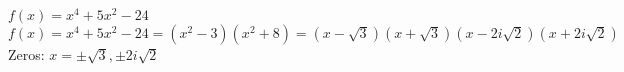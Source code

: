 {$f(x) = x^4 + 5x^2 - 24$}
{$f(x) = x^4+5x^2-24 = \left(x^2-3 \right) \left(x^2+8\right) = (x-\sqrt{3})(x+\sqrt{3})\left(x - 2i \sqrt{2}\right)\left(x + 2i \sqrt{2}\right)$\\
Zeros:  $x = \pm \sqrt{3}, \pm 2i \sqrt{2}$}